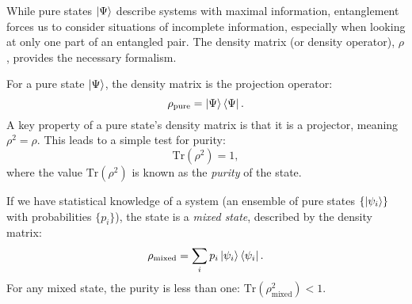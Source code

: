 While pure states $\ket{\Psi}$ describe systems with maximal information,
entanglement forces us to consider situations of incomplete information,
especially when looking at only one part of an entangled pair. The
density matrix (or density operator), $\rho$, provides the necessary
formalism.

For a pure state $\ket{\Psi}$, the density matrix is the projection operator:
\begin{equation}
	\rho_{\text{pure}} = \ket{\Psi}\bra{\Psi}.
\end{equation}
A key property of a pure state's density matrix is that it is a projector,
meaning $\rho^2 = \rho$. This leads to a simple test for purity:
\begin{equation}
	\mathrm{Tr}(\rho^2) = 1,
\end{equation}
where the value $\mathrm{Tr}(\rho^2)$ is known as the \textit{purity} of the
state.

If we have statistical knowledge of a system (an ensemble of pure states
$\{\ket{\psi_i}\}$ with probabilities $\{p_i\}$), the state is a
\emph{mixed state}, described by the density matrix:
\begin{equation}
	\rho_{\text{mixed}} = \sum_i p_i \ket{\psi_i}\bra{\psi_i}.
\end{equation}
For any mixed state, the purity is less than one:
$\mathrm{Tr}(\rho_{\text{mixed}}^2) < 1$.
